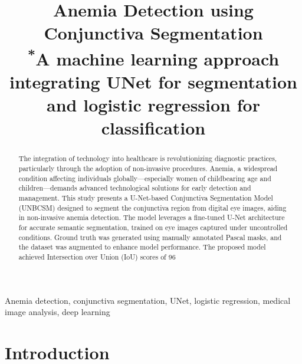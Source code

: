 \documentclass[conference]{IEEEtran}
\begin{document}
\title{Anemia Detection using Conjunctiva Segmentation\\
{\footnotesize \textsuperscript{*}A machine learning approach integrating UNet for segmentation and logistic regression for classification}
}

\author{
\and
{}
}

\maketitle

\begin{abstract}
The integration of technology into healthcare is revolutionizing diagnostic practices, particularly through the adoption of non-invasive procedures. Anemia, a widespread condition affecting individuals globally—especially women of childbearing age and children—demands advanced technological solutions for early detection and management. This study presents a U-Net-based Conjunctiva Segmentation Model (UNBCSM) designed to segment the conjunctiva region from digital eye images, aiding in non-invasive anemia detection. The model leverages a fine-tuned U-Net architecture for accurate semantic segmentation, trained on eye images captured under uncontrolled conditions. Ground truth was generated using manually annotated Pascal masks, and the dataset was augmented to enhance model performance. The proposed model achieved Intersection over Union (IoU) scores of 96%
\end{abstract}

\begin{IEEEkeywords}
Anemia detection, conjunctiva segmentation, UNet, logistic regression, medical image analysis, deep learning
\end{IEEEkeywords}

\section{\textbf{Introduction}}
\end{document}
